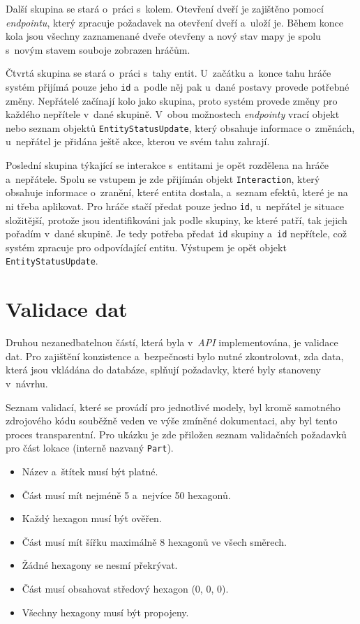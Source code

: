 Další skupina se stará o~práci s~kolem. Otevření dveří je zajištěno pomocí \textit{endpointu}, který zpracuje požadavek na otevření dveří a~uloží je. Během konce kola jsou všechny zaznamenané dveře otevřeny a nový stav mapy je spolu s~novým stavem souboje zobrazen hráčům.

Čtvrtá skupina se stará o~práci s~tahy entit. U~začátku a~konce tahu hráče systém přijímá pouze jeho \texttt{id} a~podle něj pak u~dané postavy provede potřebné změny. Nepřátelé začínají kolo jako skupina, proto systém provede změny pro každého nepřítele v~dané skupině. V~obou možnostech \textit{endpointy} vrací objekt nebo seznam objektů \texttt{EntityStatusUpdate}, který obsahuje informace o~změnách, u~nepřátel je přidána ještě akce, kterou ve svém tahu zahrají.

Poslední skupina týkající se interakce s~entitami je opět rozdělena na hráče a~nepřátele. Spolu se vstupem je zde přijímán objekt \texttt{Interaction}, který obsahuje informace o~zranění, které entita dostala, a~seznam efektů, které je na ni třeba aplikovat. Pro hráče stačí předat pouze jedno \texttt{id}, u~nepřátel je situace složitější, protože jsou identifikováni jak podle skupiny, ke které patří, tak jejich pořadím v~dané skupině. Je tedy potřeba předat \texttt{id} skupiny a~\texttt{id} nepřítele, což systém zpracuje pro odpovídající entitu. Výstupem je opět objekt \texttt{EntityStatusUpdate}.

\section{Validace dat}
\label{sec:validation}

Druhou nezanedbatelnou částí, která byla v~\textit{API} implementována, je validace dat. Pro zajištění konzistence a~bezpečnosti bylo nutné zkontrolovat, zda data, která jsou vkládána do databáze, splňují požadavky, které byly stanoveny v~návrhu.

Seznam validací, které se provádí pro jednotlivé modely, byl kromě samotného zdrojového kódu souběžně veden ve výše zmíněné dokumentaci, aby byl tento proces transparentní. Pro ukázku je zde přiložen seznam validačních požadavků pro část lokace (interně nazvaný \texttt{Part}).

\begin{itemize}
    \setlength\itemsep{0.0mm}
    \item Název a~štítek musí být platné.
    \item Část musí mít nejméně 5 a~nejvíce 50 hexagonů.
    \item Každý hexagon musí být ověřen.
    \item Část musí mít šířku maximálně 8 hexagonů ve všech směrech.
    \item Žádné hexagony se nesmí překrývat.
    \item Část musí obsahovat středový hexagon (0, 0, 0).
    \item Všechny hexagony musí být propojeny.
\end{itemize}

